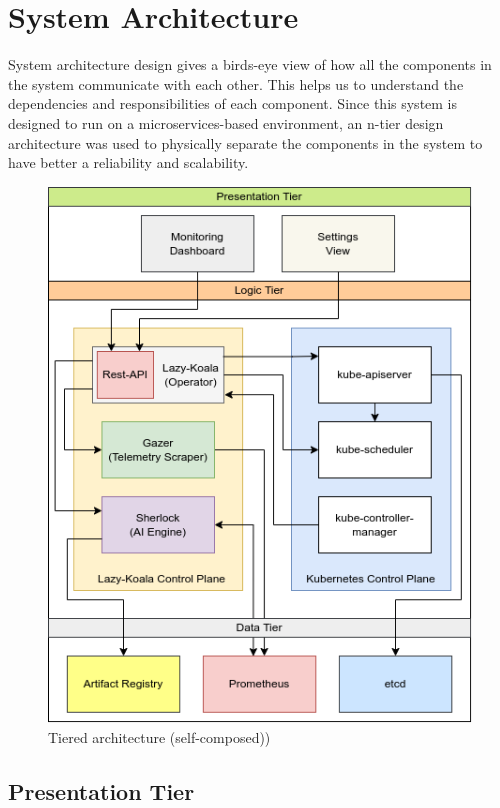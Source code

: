 \section{System Architecture}

System architecture design gives a birds-eye view of how all the components in the system communicate with each other. This helps us to understand the dependencies and responsibilities of each component. Since this system is designed to run on a microservices-based environment, an n-tier design architecture was used to physically separate the components in the system to have better a reliability and scalability.

\begin{figure}[H]
    \includegraphics[width=14cm]{assets/system-design/tier-architecture.png}
    \caption{Tiered architecture (self-composed))}
    \label{fig:tier-architecture}
\end{figure}

\subsection{Presentation Tier}

